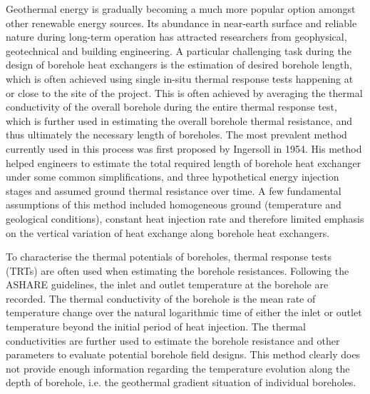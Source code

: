 Geothermal energy is gradually becoming a much more popular option amongst other renewable energy sources. Its abundance in near-earth surface and reliable nature during long-term operation has attracted researchers from geophysical, geotechnical and building engineering. A particular challenging task during the design of borehole heat exchangers is the estimation of desired borehole length, which is often achieved using single in-situ thermal response tests happening at or close to the site of the project. This is often achieved by averaging the thermal conductivity of the overall borehole during the entire thermal response test, which is further used in estimating the overall borehole thermal resistance, and thus ultimately the necessary length of boreholes. The most prevalent method currently used in this process was first proposed by Ingersoll in 1954. His method helped engineers to estimate the total required length of borehole heat exchanger under some common simplifications, and three hypothetical energy injection stages and assumed ground thermal resistance over time. A few fundamental assumptions of this method included homogeneous ground (temperature and geological conditions), constant heat injection rate and therefore limited emphasis on the vertical variation of heat exchange along borehole heat exchangers. 


To characterise the thermal potentials of boreholes, thermal response tests (TRTs) are often used when estimating the borehole resistances. Following the ASHARE guidelines, the inlet and outlet temperature at the borehole are recorded. The thermal conductivity of the borehole is the mean rate of temperature change over the natural logarithmic time of either the inlet or outlet temperature beyond the initial period of heat injection. The thermal conductivities are further used to estimate the borehole resistance and other parameters to evaluate potential borehole field designs. This method clearly does not provide enough information regarding the temperature evolution along the depth of borehole, i.e. the geothermal gradient situation of individual boreholes. 

